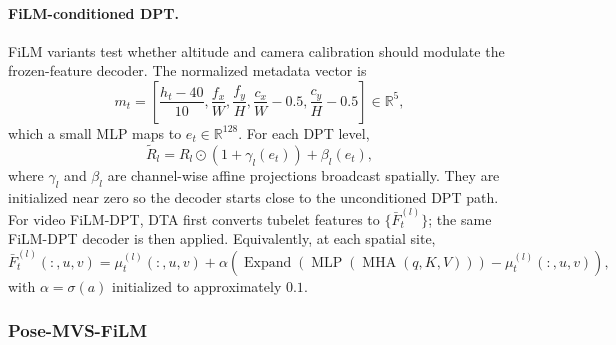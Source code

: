 \paragraph{FiLM-conditioned DPT.}
\label{sec:method_dpt_film}
FiLM variants test whether altitude and camera calibration should modulate the frozen-feature decoder. The normalized metadata vector is
\begin{equation}
    m_t=\left[
    \frac{h_t-40}{10},\frac{f_x}{W},\frac{f_y}{H},\frac{c_x}{W}-0.5,\frac{c_y}{H}-0.5
    \right]\in\mathbb{R}^{5},
    \label{eq:metadata_vector}
\end{equation}
which a small MLP maps to $e_t\in\mathbb{R}^{128}$. For each DPT level,
\begin{equation}
    \widetilde{R}_l = R_l\odot\left(1+\gamma_l(e_t)\right)+\beta_l(e_t),
    \label{eq:film}
\end{equation}
where $\gamma_l$ and $\beta_l$ are channel-wise affine projections broadcast spatially. They are initialized near zero so the decoder starts close to the unconditioned DPT path. For video FiLM-DPT, DTA first converts tubelet features to $\{\bar{F}_t^{(l)}\}$; the same FiLM-DPT decoder is then applied. Equivalently, at each spatial site,
\begin{equation}
    \bar{F}_{t}^{(l)}(:,u,v)=
    \mu_{t}^{(l)}(:,u,v)
    +\alpha\left(\operatorname{Expand}\left(\operatorname{MLP}\left(\operatorname{MHA}(q,K,V)\right)\right)
    -\mu_{t}^{(l)}(:,u,v)\right),
    \label{eq:dta}
\end{equation}
with $\alpha=\sigma(a)$ initialized to approximately $0.1$.

\subsubsection{Pose-MVS-FiLM}
\label{sec:method_depth_pose_mvs_film}

